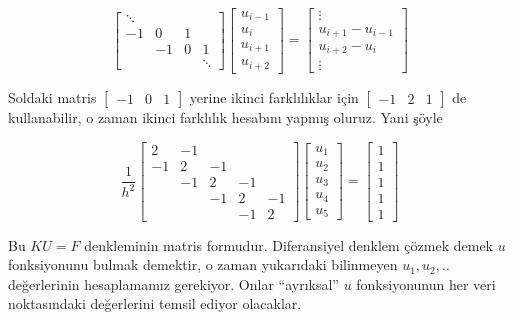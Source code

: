 \documentclass[12pt,fleqn]{article}\usepackage{../../common}
\begin{document}
$$ 
\left[\begin{array}{rrrr}
\ddots &&& \\
-1 & 0 & 1 & \\
 & -1 & 0 & 1 \\
&&& \ddots 
\end{array}\right]
\left[\begin{array}{l}
u_{i-1} \\
u_{i} \\
u_{i+1} \\
u_{i+2} 
\end{array}\right]
=
\left[\begin{array}{c}
\vdots \\
u_{i+1}-u_{i-1} \\
u_{i+2}-u_i \\
\vdots
\end{array}\right]
 $$

Soldaki matris $\left[\begin{array}{ccc} -1 & 0 & 1\end{array}\right]$
yerine ikinci farklılıklar için
$\left[\begin{array}{ccc} -1 & 2 & 1\end{array}\right]$ de kullanabilir, o zaman
ikinci farklılık hesabını yapmış oluruz. Yani şöyle

$$ 
\frac{1}{h^2} \left[\begin{array}{rrrrr} 2 & -1 & & & \\ -1 & 2 & -1 & & \\ & -1
    & 2 & -1 & \\ & & -1 & 2 & -1 \\ & & & -1 & 2
\end{array}\right]
\left[\begin{array}{r}
u_1 \\
u_2 \\
u_3 \\
u_4 \\
u_5 
\end{array}\right] 
=
\left[\begin{array}{r}
1 \\
1 \\
1 \\
1 \\
1 
\end{array}\right]
 $$

Bu $KU = F$ denkleminin matris formudur. Diferansiyel denklem çözmek demek
$u$ fonksiyonunu bulmak demektir, o zaman yukarıdaki bilinmeyen
$u_1,u_2,..$ değerlerinin hesaplamamız gerekiyor. Onlar ``ayrıksal'' $u$
fonksiyonunun her veri noktasındaki değerlerini temsil ediyor olacaklar. 
\end{document}

